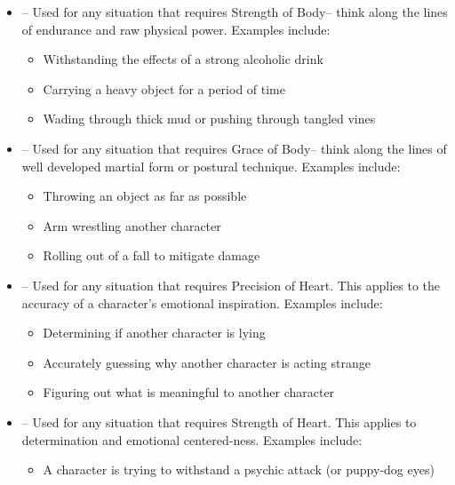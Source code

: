 \begin{GRPquicknotewide}
\begin{itemize}
		\begin{itemize}
			\item Aiming a ranged weapon at a moving target
			\tcbbreak
			\item Catching a rapidly moving small object
			\item Disarming a delicate trap without triggering it
		\end{itemize}
	\item {}-- Used for any situation that requires Strength of Body-- think along the lines of endurance and raw physical power. Examples include:
		\begin{itemize}
			\item Withstanding the effects of a strong alcoholic drink
			\item Carrying a heavy object for a period of time
			\item Wading through thick mud or pushing through tangled vines
		\end{itemize}
	\item {}-- Used for any situation that requires Grace of Body-- think along the lines of well developed martial form or postural technique. Examples include:
		\begin{itemize}
			\item Throwing an object as far as possible
			\item Arm wrestling another character
			\item Rolling out of a fall to mitigate damage
		\end{itemize}
	\item {}-- Used for any situation that requires Precision of Heart. This applies to the accuracy of a character's emotional inspiration. Examples include:
		\begin{itemize}
			\item Determining if another character is lying
			\item Accurately guessing why another character is acting strange
			\item Figuring out what is meaningful to another character
		\end{itemize}
	\item {}-- Used for any situation that requires Strength of Heart. This applies to determination and emotional centered-ness. Examples include:
		\begin{itemize}
			\item A character is trying to withstand a psychic attack (or puppy-dog eyes)

\end{itemize}
\end{itemize}
\end{GRPquicknotewide}
